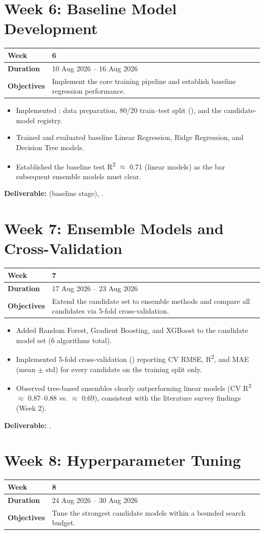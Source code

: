 \documentclass[12pt,a4paper]{report}
\newcommand{\weektable}[3]{%
\begin{longtable}{|p{3.6cm}|p{10.5cm}|}
\hline
\textbf{Week} & \textbf{#1} \\
\hline
\textbf{Duration} & #2 \\
\hline
\textbf{Objectives} & #3 \\
\hline
\end{longtable}
}
\begin{document}
\chapter{Week 6: Baseline Model Development}
\weektable{6}{10 Aug 2026 -- 16 Aug 2026}{Implement the core training pipeline and establish baseline regression performance.}

\begin{itemize}[nosep]
    \item Implemented : data preparation, 80/20 train--test split (), and the candidate-model registry.
    \item Trained and evaluated baseline Linear Regression, Ridge Regression, and Decision Tree models.
    \item Established the baseline test R\textsuperscript{2} $\approx$ 0.71 (linear models) as the bar subsequent ensemble models must clear.
\end{itemize}
\textbf{Deliverable:}  (baseline stage), .

\chapter{Week 7: Ensemble Models and Cross-Validation}
\weektable{7}{17 Aug 2026 -- 23 Aug 2026}{Extend the candidate set to ensemble methods and compare all candidates via 5-fold cross-validation.}

\begin{itemize}[nosep]
    \item Added Random Forest, Gradient Boosting, and XGBoost to the candidate model set (6 algorithms total).
    \item Implemented 5-fold cross-validation () reporting CV RMSE, R\textsuperscript{2}, and MAE (mean $\pm$ std) for every candidate on the training split only.
    \item Observed tree-based ensembles clearly outperforming linear models (CV R\textsuperscript{2} $\approx$ 0.87--0.88 vs. $\approx$ 0.69), consistent with the literature survey findings (Week 2).
\end{itemize}
\textbf{Deliverable:} .

\chapter{Week 8: Hyperparameter Tuning}
\weektable{8}{24 Aug 2026 -- 30 Aug 2026}{Tune the strongest candidate models within a bounded search budget.}
\end{document}
